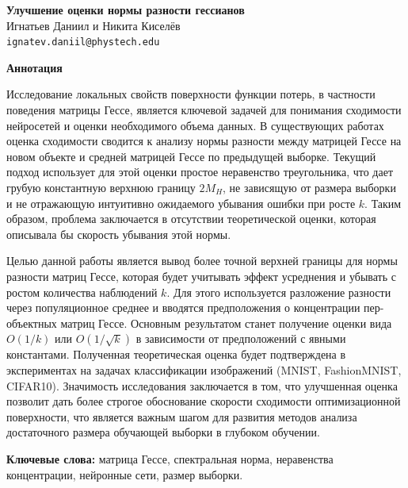 \documentclass[11pt]{extarticle}
\begin{document}
\begin{center}
    \Large\textbf{Улучшение оценки нормы разности гессианов} \\
    \vspace{0.5cm}
    \large Игнатьев Даниил и Никита Киселёв  \\
    \texttt{ignatev.daniil@phystech.edu}
\end{center}

\vspace{1cm}

\begin{center}
    \textbf{Аннотация}
\end{center}
\begin{center}
    \small
    \begin{minipage}{0.85\textwidth}
        Исследование локальных свойств поверхности функции потерь, в частности поведения матрицы Гессе, является ключевой задачей для понимания сходимости нейросетей и оценки необходимого объема данных. В существующих работах оценка сходимости сводится к анализу нормы разности между матрицей Гессе на новом объекте и средней матрицей Гессе по предыдущей выборке. Текущий подход использует для этой оценки простое неравенство треугольника, что дает грубую константную верхнюю границу $2M_H$, не зависящую от размера выборки и не отражающую интуитивно ожидаемого убывания ошибки при росте $k$. Таким образом, проблема заключается в отсутствии теоретической оценки, которая описывала бы скорость убывания этой нормы.

        Целью данной работы является вывод более точной верхней границы для нормы разности матриц Гессе, которая будет учитывать эффект усреднения и убывать с ростом количества наблюдений $k$. Для этого используется разложение разности через популяционное среднее и вводятся предположения о концентрации пер-объектных матриц Гессе. Основным результатом станет получение оценки вида $O(1/k)$ или $O(1/\sqrt{k})$ в зависимости от предположений с явными константами. Полученная теоретическая оценка будет подтверждена в экспериментах на задачах классификации изображений (MNIST, FashionMNIST, CIFAR10). Значимость исследования заключается в том, что улучшенная оценка позволит дать более строгое обоснование скорости сходимости оптимизационной поверхности, что является важным шагом для развития методов анализа достаточного размера обучающей выборки в глубоком обучении.

        \textbf{Ключевые слова:} матрица Гессе, спектральная норма, неравенства концентрации, нейронные сети, размер выборки.
    \end{minipage}
\end{center}
\end{document}
